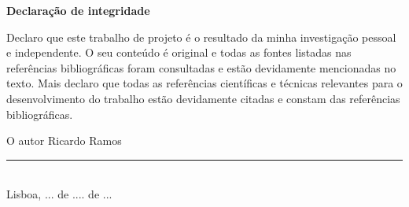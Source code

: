 \begin{center}
    \textbf{Declaração de integridade}
\end{center}

Declaro que este trabalho de projeto é o resultado da minha investigação pessoal e independente. O seu conteúdo é original e todas as fontes listadas nas referências bibliográficas foram consultadas e estão devidamente mencionadas no texto. Mais declaro que todas as referências científicas e técnicas relevantes para o desenvolvimento do trabalho estão devidamente citadas e constam das referências bibliográficas.

\begin{center}
O autor Ricardo Ramos
\\[2em]

\rule{.5\textwidth}{1pt}
\\[.5em]
\fontsize{10}{12.2}
\selectfont
Lisboa, ...  de .... de ...
\end{center}